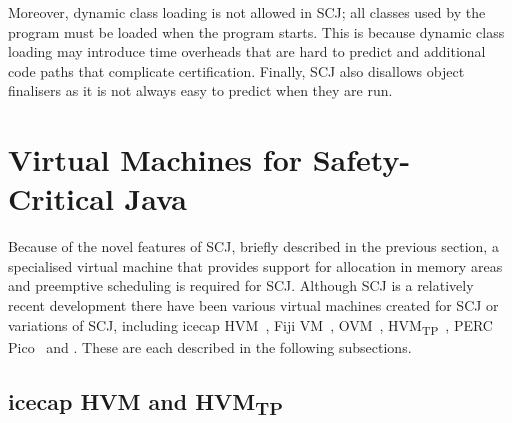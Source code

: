 Moreover, dynamic class loading is not allowed in SCJ; all classes
used by the program must be loaded when the program starts.
This is because dynamic class loading may introduce time overheads
that are hard to predict and additional code paths that complicate
certification.
Finally, SCJ also disallows object finalisers as it is not always easy
to predict when they are run.

\section{Virtual Machines for Safety-Critical Java}
\label{virtual-machines-section}


Because of the novel features of SCJ, briefly described in the
previous section, a specialised virtual machine that provides support
for allocation in memory areas and preemptive scheduling is required
for SCJ.
Although SCJ is a relatively recent development there have been
various virtual machines created for SCJ or variations of SCJ,
including  icecap
HVM~\cite{sondergaard2012}, Fiji VM~\cite{pizlo2009},
OVM~\cite{armbruster2007}, HVM\textsubscript{TP}~\cite{luckow2014},
PERC Pico~\cite{atego2015, richard2010} and
.
These are each described in the following subsections.


\subsection{icecap HVM and
  \texorpdfstring{HVM\textsubscript{TP}}{HVMTP}}


